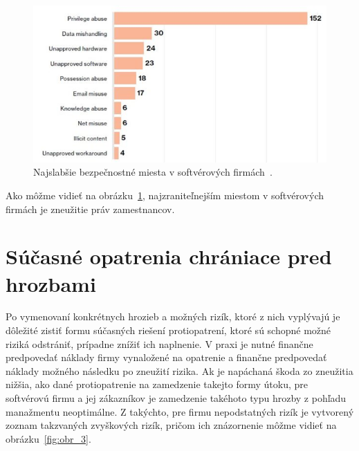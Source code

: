 \begin{figure}[H]
\begin{center}\includegraphics[width=\textwidth,height=6cm,keepaspectratio=true]{assets/priviledge_abuse.jpg}\end{center}
\caption[Najslabšie bezpečnostné miesta v softvérových firmách]{Najslabšie bezpečnostné miesta v softvérových firmách~\cite{WeaknestLink}.}\label{fig:obr_2}
\end{figure}

Ako môžme vidieť na obrázku~\ref{fig:obr_2}, najzraniteľnejším miestom v softvérových firmách je zneužitie práv zamestnancov.

\section{Súčasné opatrenia chrániace pred hrozbami}\label{sec:sucasne-opatrenia-chraniace-pred-hrozbami}

Po vymenovaní konkrétnych hrozieb a možných rizík, ktoré z nich vyplývajú je dôležité zistiť formu súčasných riešení
protiopatrení, ktoré sú schopné možné riziká odstrániť, prípadne znížiť ich naplnenie.
V praxi je nutné finančne predpovedať náklady firmy vynaložené na opatrenie a finančne predpovedať náklady možného
následku po zneužití rizika.
Ak je napáchaná škoda zo zneužitia nižšia, ako dané protiopatrenie na zamedzenie takejto formy útoku, pre softvérovú
firmu a jej zákazníkov je zamedzenie takéhoto typu hrozby z pohľadu manažmentu neoptimálne.
Z takýchto, pre firmu nepodstatných rizík je vytvorený zoznam takzvaných zvyškových rizík, pričom ich znázornenie môžme
vidieť na obrázku~\ref{fig:obr_3}.

